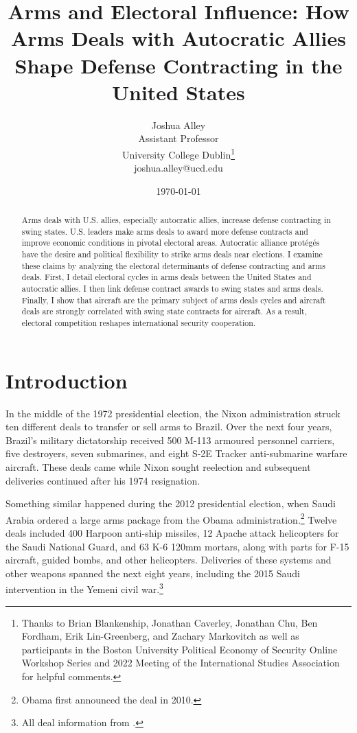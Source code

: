 \documentclass[12pt]{article}
\title{\textbf{Arms and Electoral Influence: How Arms Deals with Autocratic Allies Shape Defense Contracting in the United States}}
\author{Joshua Alley \\
Assistant Professor \\
University College Dublin\thanks{Thanks to Brian Blankenship, Jonathan Caverley, Jonathan Chu, Ben Fordham, Erik Lin-Greenberg, and Zachary Markovitch as well as participants in the Boston University Political Economy of Security Online Workshop Series and 2022 Meeting of the International Studies Association for helpful comments.} \\
joshua.alley@ucd.edu
}
\date{\today}
\begin{document}
\maketitle 

\begin{abstract} 
Arms deals with U.S. allies, especially autocratic allies, increase defense contracting in swing states. 
U.S. leaders make arms deals to award more defense contracts and improve economic conditions in pivotal electoral areas.
Autocratic alliance prot{\'e}g{\'e}s have the desire and political flexibility to strike arms deals near elections. 
I examine these claims by analyzing the electoral determinants of defense contracting and arms deals.  
First, I detail electoral cycles in arms deals between the United States and autocratic allies. 
I then link defense contract awards to swing states and arms deals.
Finally, I show that aircraft are the primary subject of arms deals cycles and aircraft deals are strongly correlated with swing state contracts for aircraft.  
As a result, electoral competition reshapes international security cooperation.
\end{abstract} 


\newpage 
\doublespace 


\section{Introduction}



In the middle of the 1972 presidential election, the Nixon administration struck ten different deals to transfer or sell arms to Brazil.
Over the next four years, Brazil's military dictatorship received 500 M-113 armoured personnel carriers, five destroyers, seven submarines, and eight S-2E Tracker anti-submarine warfare aircraft.
These deals came while Nixon sought reelection and subsequent deliveries continued after his 1974 resignation. 


Something similar happened during the 2012 presidential election, when Saudi Arabia ordered a large arms package from the Obama administration.\footnote{Obama first announced the deal in 2010.} 
Twelve deals included 400 Harpoon anti-ship missiles, 12 Apache attack helicopters for the Saudi National Guard, and 63 K-6 120mm mortars, along with parts for F-15 aircraft, guided bombs, and other helicopters. 
Deliveries of these systems and other weapons spanned the next eight years, including the 2015 Saudi intervention in the Yemeni civil war.\footnote{All deal information from \citep{Sipri2022}.}
\end{document}
